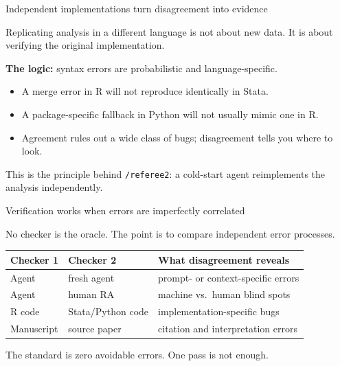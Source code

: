 \documentclass[aspectratio=169,11pt]{beamer}
\begin{document}
\begin{frame}{Independent implementations turn disagreement into evidence}

Replicating analysis in a different language is not about new data. It is about verifying the original implementation.

\vspace{0.35cm}

\textbf{The logic:} syntax errors are probabilistic and language-specific.

\begin{itemize}\setlength\itemsep{0.25em}
    \item A merge error in R will not reproduce identically in Stata.
    \item A package-specific fallback in Python will not usually mimic one in R.
    \item Agreement rules out a wide class of bugs; disagreement tells you where to look.
\end{itemize}

\vspace{0.35cm}

\alert{This is the principle behind \texttt{/referee2}: a cold-start agent reimplements the analysis independently.}

\end{frame}

\begin{frame}{Verification works when errors are imperfectly correlated}

No checker is the oracle. The point is to compare independent error processes.

\vspace{0.3cm}

\begin{center}
\small
\begin{tabular}{@{}lll@{}}
\toprule
Checker 1 & Checker 2 & What disagreement reveals \\
\midrule
Agent & fresh agent & prompt- or context-specific errors \\
Agent & human RA & machine vs.\ human blind spots \\
R code & Stata/Python code & implementation-specific bugs \\
Manuscript & source paper & citation and interpretation errors \\
\bottomrule
\end{tabular}
\end{center}

\vspace{0.35cm}

\alert{The standard is zero avoidable errors. One pass is not enough.}

\end{frame}
\end{document}
